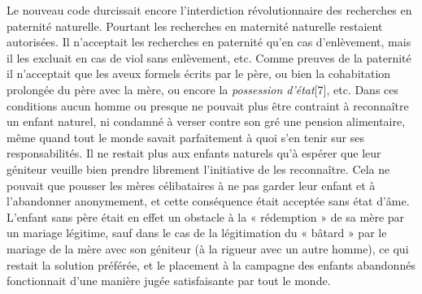  Le nouveau code durcissait encore l'interdiction révolutionnaire des recherches en paternité naturelle. Pourtant les recherches en maternité naturelle restaient autorisées. Il n'acceptait les recherches en paternité qu'en cas d'enlèvement, mais il les excluait en cas de viol sans enlèvement, etc. Comme preuves de la paternité il n'acceptait que les aveux formels écrits par le père, ou bien la cohabitation prolongée du père avec la mère, ou encore la \emph{possession d'état}[7], etc. Dans ces conditions aucun homme ou presque ne pouvait plus être contraint à reconnaître un enfant naturel, ni condamné à verser contre son gré une pension alimentaire, même quand tout le monde savait parfaitement à quoi s'en tenir sur ses responsabilités. Il ne restait plus aux enfants naturels qu'à espérer que leur géniteur veuille bien prendre librement l'initiative de les reconnaître. 
 Cela ne pouvait que pousser les mères célibataires à ne pas garder leur enfant et à l'abandonner anonymement, et cette conséquence était acceptée sans état d'âme. L'enfant sans père était en effet un obstacle à la « rédemption » de sa mère par un mariage légitime, sauf dans le cas de la légitimation du « bâtard » par le mariage de la mère avec son géniteur (à la rigueur avec un autre homme), ce qui restait la solution préférée, et le placement à la campagne des enfants abandonnés fonctionnait d'une manière jugée satisfaisante par tout le monde. 
 
